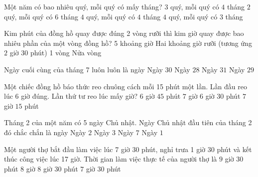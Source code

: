 \begin{ex} %
Một năm có bao nhiêu quý, mỗi quý có mấy tháng?
\choice
{$3$ quý, mỗi quý có $4$ tháng}
{$2$ quý, mỗi quý có $6$ tháng}
{$4$ quý, mỗi quý có $4$ tháng}
{\True $4$ quý, mỗi quý có $3$ tháng}
\end{ex}

\begin{ex} %
Kim phút của đồng hồ quay được đúng 2 vòng rưỡi thì kim giờ quay được bao nhiêu phần của một vòng đồng hồ?
\choice
{5 khoảng giờ}
{\True Hai khoảng giờ rưỡi (tương ứng $2$ giờ $30$ phút)}
{1 vòng}
{Nửa vòng}
\end{ex}

\begin{ex} %
Ngày cuối cùng của tháng 7 luôn luôn là ngày
\choice
{Ngày $30$}
{Ngày $28$}
{\True Ngày $31$}
{Ngày $29$}
\end{ex}

\begin{ex} %
Một chiếc đồng hồ báo thức reo chuông cách mỗi 15 phút một lần. Lần đầu reo lúc 6 giờ đúng. Lần thứ tư reo lúc mấy giờ?
\choice
{\True $6$ giờ $45$ phút}
{$7$ giờ}
{$6$ giờ $30$ phút}
{$7$ giờ $15$ phút}
\end{ex}

\begin{ex} %
Tháng 2 của một năm có 5 ngày Chủ nhật. Ngày Chủ nhật đầu tiên của tháng 2 đó chắc chắn là ngày
\choice
{Ngày $2$}
{Ngày $3$}
{Ngày $7$}
{\True Ngày $1$}
\end{ex}

\begin{ex} %
Một người thợ bắt đầu làm việc lúc 7 giờ 30 phút, nghỉ trưa 1 giờ 30 phút và kết thúc công việc lúc 17 giờ. Thời gian làm việc thực tế của người thợ là
\choice
{$9$ giờ $30$ phút}
{\True $8$ giờ}
{$8$ giờ $30$ phút}
{$7$ giờ $30$ phút}
\end{ex}

